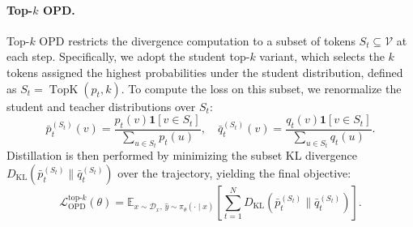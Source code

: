 \paragraph{Top-$k$ OPD.} Top-$k$ OPD restricts the divergence computation to a subset of tokens $S_t \subseteq \mathcal{V}$ at each step. Specifically, we adopt the student top-$k$ variant, which selects the $k$ tokens assigned the highest probabilities under the student distribution, defined as $S_t = \operatorname{TopK}(p_t, k)$. To compute the loss on this subset, we renormalize the student and teacher distributions over $S_t$:
\begin{equation}
\bar{p}_t^{(S_t)}(v) = \frac{p_t(v) \mathbf{1}[v \in S_t]}{\sum_{u \in S_t} p_t(u)}, \quad \bar{q}_t^{(S_t)}(v) = \frac{q_t(v) \mathbf{1}[v \in S_t]}{\sum_{u \in S_t} q_t(u)}.
\end{equation}
Distillation is then performed by minimizing the subset KL divergence $D_{\text{KL}}(\bar{p}_t^{(S_t)} \parallel \bar{q}_t^{(S_t)})$ over the trajectory, yielding the final objective:
\begin{equation}
\mathcal{L}_{\text{OPD}}^{\text{top-}k}(\theta) = \mathbb{E}_{x \sim \mathcal{D}_x, \, \hat{y} \sim \pi_\theta(\cdot \mid x)} \left[ \sum_{t=1}^N D_{\text{KL}}(\bar{p}_t^{(S_t)} \parallel \bar{q}_t^{(S_t)}) \right].
\end{equation}